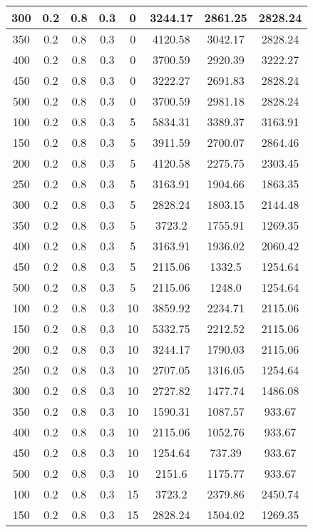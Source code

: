 \documentclass[a4paper, 12pt]{extreport}
\begin{document}
\begin{itemize}
\begin{longtable}{|c|c|c|c|c|c|c|c|}
			300 & 0.2 & 0.8 & 0.3 & 0 & 3244.17 & 2861.25 & 2828.24 \\\hline
			350 & 0.2 & 0.8 & 0.3 & 0 & 4120.58 & 3042.17 & 2828.24 \\\hline
			400 & 0.2 & 0.8 & 0.3 & 0 & 3700.59 & 2920.39 & 3222.27 \\\hline
			450 & 0.2 & 0.8 & 0.3 & 0 & 3222.27 & 2691.83 & 2828.24 \\\hline
			500 & 0.2 & 0.8 & 0.3 & 0 & 3700.59 & 2981.18 & 2828.24 \\\hline
			100 & 0.2 & 0.8 & 0.3 & 5 & 5834.31 & 3389.37 & 3163.91 \\\hline
			150 & 0.2 & 0.8 & 0.3 & 5 & 3911.59 & 2700.07 & 2864.46 \\\hline
			200 & 0.2 & 0.8 & 0.3 & 5 & 4120.58 & 2275.75 & 2303.45 \\\hline
			250 & 0.2 & 0.8 & 0.3 & 5 & 3163.91 & 1904.66 & 1863.35 \\\hline
			300 & 0.2 & 0.8 & 0.3 & 5 & 2828.24 & 1803.15 & 2144.48 \\\hline
			350 & 0.2 & 0.8 & 0.3 & 5 & 3723.2 & 1755.91 & 1269.35 \\\hline
			400 & 0.2 & 0.8 & 0.3 & 5 & 3163.91 & 1936.02 & 2060.42 \\\hline
			450 & 0.2 & 0.8 & 0.3 & 5 & 2115.06 & 1332.5 & 1254.64 \\\hline
			500 & 0.2 & 0.8 & 0.3 & 5 & 2115.06 & 1248.0 & 1254.64 \\\hline
			100 & 0.2 & 0.8 & 0.3 & 10 & 3859.92 & 2234.71 & 2115.06 \\\hline
			150 & 0.2 & 0.8 & 0.3 & 10 & 5332.75 & 2212.52 & 2115.06 \\\hline
			200 & 0.2 & 0.8 & 0.3 & 10 & 3244.17 & 1790.03 & 2115.06 \\\hline
			250 & 0.2 & 0.8 & 0.3 & 10 & 2707.05 & 1316.05 & 1254.64 \\\hline
			300 & 0.2 & 0.8 & 0.3 & 10 & 2727.82 & 1477.74 & 1486.08 \\\hline
			350 & 0.2 & 0.8 & 0.3 & 10 & 1590.31 & 1087.57 & 933.67 \\\hline
			400 & 0.2 & 0.8 & 0.3 & 10 & 2115.06 & 1052.76 & 933.67 \\\hline
			450 & 0.2 & 0.8 & 0.3 & 10 & 1254.64 & 737.39 & 933.67 \\\hline
			500 & 0.2 & 0.8 & 0.3 & 10 & 2151.6 & 1175.77 & 933.67 \\\hline
			100 & 0.2 & 0.8 & 0.3 & 15 & 3723.2 & 2379.86 & 2450.74 \\\hline
			150 & 0.2 & 0.8 & 0.3 & 15 & 2828.24 & 1504.02 & 1269.35 \\\hline

\end{longtable}
\end{itemize}
\end{document}
